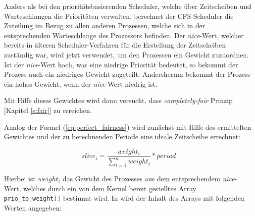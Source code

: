Anders als bei den prioritätsbasierenden Scheduler, welche über Zeitscheiben und Warte\-schlan\-gen die Prioritäten verwalten, berechnet der CFS-Scheduler die Zuteilung im Bezug zu allen anderen Prozessen, welche sich in der entsprechenden Warteschlange des Prozessors befinden. Der  \textit{nice}-Wert, welcher bereits in älteren Scheduler-\-Ver\-fahren für die Erstellung der Zeitscheiben zuständig war, wird jetzt verwendet, um den Prozessen ein Gewicht zuzuordnen. Ist der \textit{nice}-Wert hoch, was eine niedrige Priorität bedeutet, so bekommt der Prozess auch ein niedriges Gewicht zugeteilt. Andersherum bekommt der Prozess ein hohes Gewicht, wenn der  \textit{nice}-Wert niedrig ist.

Mit Hilfe dieses Gewichtes wird dann versucht, dass \textit{com\-pletely-fair} Prinzip [Kapitel \ref{s:fair}] zu erreichen. 

Analog der Formel (\ref{eq:perfect_fairness}) wird zunächst mit Hilfe des ermittelten Gewichtes und der zu berechnenden Periode eine ideale Zeitscheibe errechnet: %

\begin{equation}
slice_{i} = \frac{weight_{i}}{\sum_{i=1}^{n} weight_{i}} * period
\label{eq:slice}
\end{equation}


Hierbei ist \textit{$weight_{i}$} das Gewicht des Prozesses aus dem entsprechendem \textit{nice}-Wert, welches durch ein von dem Kernel bereit gestelltes Array \texttt{prio\_to\_weight[]} bestimmt wird. In \cite{nikita} wird der Inhalt des Arrays mit folgenden Werten angegeben:


